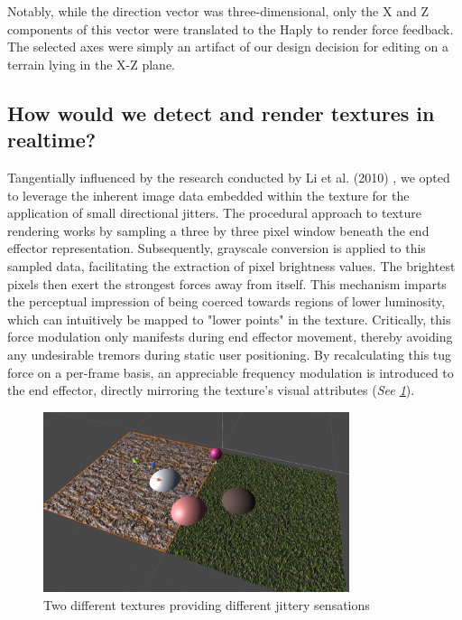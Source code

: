Notably, while the direction vector was three-dimensional, only the X and Z components of this vector were translated to the Haply to render force feedback. The selected axes were simply an artifact of our design decision for editing on a terrain lying in the X-Z plane.

\subsection{How would we detect and render textures in realtime?} \label{subsec:texture-rendering}

Tangentially influenced by the research conducted by Li et al. (2010) \cite{li2010image}, we opted to leverage the inherent image data embedded within the texture for the application of small directional jitters. The procedural approach to texture rendering works by sampling a three by three pixel window beneath the end effector representation. Subsequently, grayscale conversion is applied to this sampled data, facilitating the extraction of pixel brightness values. The brightest pixels then exert the strongest forces away from itself. This mechanism imparts the perceptual impression of being coerced towards regions of lower luminosity, which can intuitively be mapped to "lower points" in the texture. Critically, this force modulation only manifests during end effector movement, thereby avoiding any undesirable tremors during static user positioning. By recalculating this tug force on a per-frame basis, an appreciable frequency modulation is introduced to the end effector, directly mirroring the texture's visual attributes (\textit{See \ref{fig:texture-rendering}}).

\begin{figure}[htbp]
    \centering
    \includegraphics[width=0.8\textwidth]{images/approach-texture-rendering.png} 
    \caption{Two different textures providing different jittery sensations}
    \label{fig:texture-rendering}
\end{figure}

